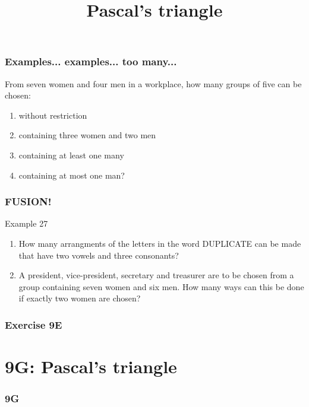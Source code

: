 \documentclass[
	11pt, %
]{beamer}
\begin{document}
\begin{frame}[t]
    \frametitle{Examples... examples... too many...}
    From seven women and four men in a workplace, how many groups of five can be chosen:\\
    \begin{enumerate}
        \item without restriction
        \item containing three women and two men
        \item containing at least one many
        \item containing at most one man?
    \end{enumerate}
\end{frame}

\begin{frame}[t]
    \frametitle{FUSION!}
    \begin{block}{Example 27}
        \begin{enumerate}
            \item How many arrangments of the letters in the word DUPLICATE can be made that have two vowels and three consonants?
            \item A president, vice-president, secretary and treasurer are to be chosen from a group containing 
            seven women and six men. How many ways can this be done if exactly two women are chosen?
        \end{enumerate}        
    \end{block}
\end{frame}

\begin{frame}
    \frametitle{Exercise 9E}
\end{frame}


\section{9G: Pascal's triangle}
\begin{frame}
    \frametitle{9G}
    \begin{center}
        \title{Pascal's triangle}
        \maketitle
    \end{center}
\end{frame}
\end{document}

